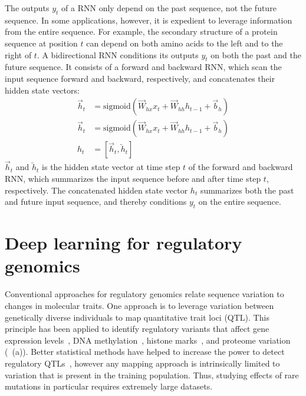 The outputs $y_t$ of a RNN only depend on the past sequence, not the future sequence. In some applications, however, it is expedient to leverage information from the entire sequence. For example, the secondary structure of a protein sequence at position $t$ can depend on both amino acids to the left and to the right of $t$. A bidirectional RNN conditions its outputs $y_t$ on both the past and the future sequence. It consists of a forward and backward RNN, which scan the input sequence forward and backward, respectively, and concatenates their hidden state vectors:
\begin{align}
  \overrightarrow{h}_t&=\textrm{sigmoid}(\overrightarrow{W}_{hx}x_t+\overrightarrow{W}_{hh}h_{t-1}+\overrightarrow{b}_h) \\
  \overrightarrow{h}_t&=\textrm{sigmoid}(\overrightarrow{W}_{hx}x_t+\overrightarrow{W}_{hh}h_{t-1}+\overrightarrow{b}_h) \\
  h_t&=[\overrightarrow{h}_t, \overleftarrow{h}_t]
\end{align}
$\overrightarrow{h}_t$ and $\overleftarrow{h}_t$ is the hidden state vector at time step $t$ of the forward and backward RNN, which summarizes the input sequence before and after time step $t$, respectively. The concatenated hidden state vector $h_t$ summarizes both the past and future input sequence, and thereby conditions $y_t$ on the entire sequence.


\section{Deep learning for regulatory genomics} \label{sec:dl_genomics}

Conventional approaches for regulatory genomics relate sequence variation to changes in molecular traits. One approach is to leverage variation between genetically diverse individuals to map quantitative trait loci (QTL). This principle has been applied to identify regulatory variants that affect gene expression levels~\citep{montgomery_transcriptome_2010,pickrell_understanding_2010}, DNA methylation~\citep{bell_dna_2011,gibbs_abundant_2010}, histone marks~\citep{grubert_genetic_2015,waszak_population_2015}, and proteome variation~\citep{albert_genetics_2014,battle_genomic_2015,parts_heritability_2014,vincent_stacked_2010} (~(a)). Better statistical methods have helped to increase the power to detect regulatory QTLs~\citep{kang_accurate_2008,parts_joint_2011,rakitsch_modelling_2016,stegle_bayesian_2010}, however any mapping approach is intrinsically limited to variation that is present in the training population. Thus, studying effects of rare mutations in particular requires extremely large datasets.

